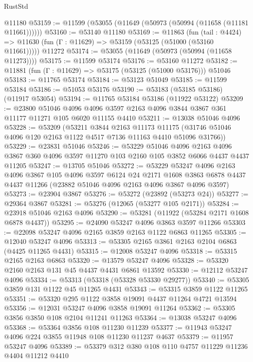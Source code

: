 \begin{lexlean}{RustStd}
\begin{coremodule}
    @11180
@53159 := @11599 (@53055 (@11649 (@50973 (@50994 (@11658 (@11181 @11661))))))
@53160 := @53140 @11180
@53169 := @11863
    (fun (tail : @4424) => @11630 (fun (Γ : @11629) => @53159 (@53125 (@51000 (@53160 @11661)))))
    @11272
@53174 := @53055 (@11649 (@50973 (@50994 (@11658 @11273))))
@53175 := @11599 @53174
@53176 := @53160 @11272
@53182 := @11881 (fun (Γ : @11629) => @53175 (@53125 (@51000 @53176))) @51046
@53183 := @11765 @53174
@53184 := @53123 @51049
@53185 := @11599 @53184
@53186 := @51053 @53176
@53190 := @53183 (@53185 @53186) (@11917 @53054)
@53194 := @11765 @53184 @53186 (@11922 @53122)
@53209 := @23800
    @51046
    @4096
    @4096
    @3597
    @2163
    @4096
    @3844
    @3867
    @361
    @11177
    @11271
    @105
    @6020
    @11155
    @4410
@53211 := @13038 @51046 @4096
@53228 := @53209
    (@53211
      @3844
      @2163
      @11173
      @11175
      (@31746 @51046 @4096 @120 @2163 @1122 @4517 @7136 @11163 @4410 @51096 @31766))
@53229 := @23831 @51046
@53246 := @53229
    @51046
    @4096
    @2163
    @4096
    @3867
    @360
    @4096
    @3597
    @11270
    @103
    @2160
    @105
    @3852
    @6066
    @4437
    @4437
    @11205
@53247 := @13705 @51046
@53272 := @53229
    @53247
    @4096
    @2163
    @4096
    @3867
    @105
    @4096
    @3597
    @6124
    @24
    @2171
    @1608
    @3863
    @6878
    @4437
    @4437
    @11266
    (@23882 @51046 @4096 @2163 @4096 @3867 @4096 @3597)
@53273 := @23904 @3867
@53276 := @53272 (@23892 (@53273 @24))
@53277 := @29364 @3867
@53281 := @53276 (@12065 (@53277 @105 @2171))
@53284 := @23918 @51046 @2163 @4096
@53290 := @53281 (@11922 (@53284 @2171 @1608 @6878 @4437))
@53295 := @24090 @53247 @4096 @3863 @3597 @11266
@53303 := @22098 @53247 @4096 @2165 @3859 @2163 @1122 @6863 @11265
@53305 := @12040 @53247 @4096
@53313 := @53305 @2165 @3861 @2163 @2104 @6863 (@4425 @11265 @4431)
@53315 := @12008 @53247 @4096
@53318 := @53315 @2165 @2163 @6863
@53320 := @13579 @53247 @4096
@53328 := @53320 @2160 @2163 @131 @45 @4437 @4431 @6861 @13592
@53330 := @12112 @53247 @4096
@53334 := @53313 (@53318 (@53328 @53330 @29277))
@53340 := @53305 @3859 @131 @1122 @45 @11265 @4431
@53343 := @53315 @3859 @1122 @11265
@53351 := @53320 @295 @1122 @3858 @19091 @4437 @11264 @4721 @13594
@53356 := @12031 @53247 @4096 @3858 @19091 @11264
@53362 := @53305 @3856 @3850 @108 @2104 @11241 @11263
@53364 := @13038 @53247 @4096
@53368 := @53364 @3856 @108 @11230 @11239
@53377 := @11943 @53247 @4096 @224 @3855 @11948 @108 @11230 @11237 @4637
@53379 := @11957 @53247 @4096
@53389 := @53379 @312 @380 @108 @110 @4757 @11229 @11236 @4404 @11212 @4410

\end{coremodule}
\end{lexlean}
